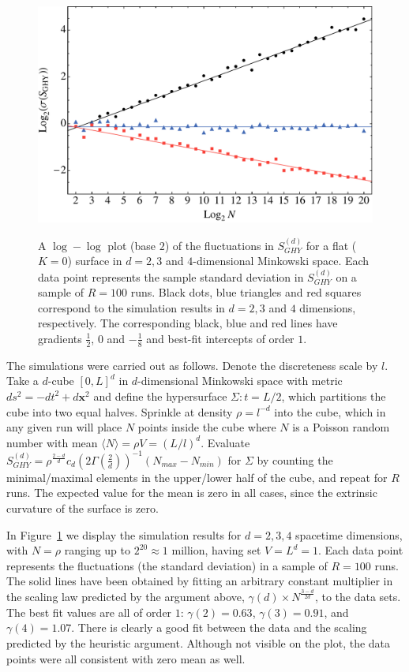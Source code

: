 \documentclass[12pt]{article}
\begin{document}
\begin{figure}[t!]
  \centering
    {\includegraphics[scale=0.6]{GHY-fluctuation_plots}}
     \caption{A $\log-\log$ plot (base $2$) of the fluctuations in $S^{(d)}_{GHY}$ for a flat ($K=0$) surface in $d=2,3$ and $4$-dimensional Minkowski space. Each data point represents the sample standard deviation in $S^{(d)}_{GHY}$ on a sample of $R=100$ runs. Black dots, blue triangles and red squares correspond to the simulation results in $d=2,3$ and $4$ dimensions, respectively. The corresponding black, blue and red lines have gradients $\frac12$, $0$ and $-\frac18$ and best-fit intercepts of order $1$.}
     \label{fig:fluctuations}
\end{figure}

 
The simulations were carried out as follows. Denote the discreteness scale by $l$. Take a $d$-cube $[0,L]^d$ in $d$-dimensional Minkowski space with metric $ds^2=-dt^2+d{\mathbf x}^2$ and define the hypersurface $\Sigma: t=L/2$, which partitions the cube into two equal halves. Sprinkle at density $\rho=l^{-d}$ into the cube, which in any given run will place $N$ points inside the cube where $N$ is a Poisson random number with mean $\langle N\rangle = \rho V=  (L/l)^d$. Evaluate $S^{(d)}_{GHY}=\rho^\frac{2-d}{d}c_d\left(2\Gamma\left(\frac{2}{d}\right)\right)^{-1}(N_{max} - N_{min})$ for $\Sigma$ by counting the minimal/maximal elements in the upper/lower half of the cube, and repeat for $R$ runs. The expected value for the mean is zero in all cases, since the extrinsic curvature of the surface is zero. 

In Figure~\ref{fig:fluctuations} we display the simulation results for $d=2,3,4$ spacetime dimensions, with $N=\rho$ ranging up to $2^{20}\approx 1$ million, having set $V=L^d=1$. Each data point represents the fluctuations (the standard deviation) in a sample of $R=100$ runs. The solid lines have been obtained by fitting an arbitrary constant multiplier in the scaling law predicted by the argument above, $\gamma(d)\times N^\frac{3-d}{2d}$, to the data sets. The best fit values are all of order $1$: $\gamma(2)=0.63$, $\gamma(3)=0.91$, and $\gamma(4)=1.07$.
There is clearly a good fit between the data and the scaling predicted by the heuristic argument. Although not visible on the plot, the data points were all consistent with zero mean as well.
\end{document}
